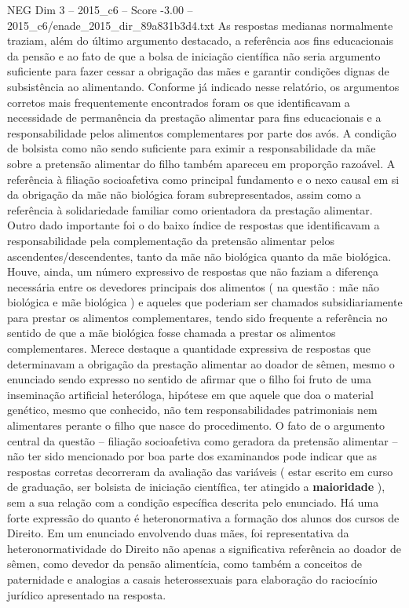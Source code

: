 \begin{textsample}{NEG Dim 3 – 2015\_c6 – Score -3.00 – 2015\_c6/enade\_2015\_dir\_89a831b3d4.txt}
As respostas medianas normalmente traziam, além do último argumento destacado, a referência aos fins educacionais da pensão e ao fato de que a bolsa de iniciação científica não seria argumento suficiente para fazer cessar a obrigação das mães e garantir condições dignas de subsistência ao alimentando.
Conforme já indicado nesse relatório, os argumentos corretos mais frequentemente encontrados foram os que identificavam a necessidade de permanência da prestação alimentar para fins educacionais e a responsabilidade pelos alimentos complementares por parte dos avós.
A condição de bolsista como não sendo suficiente para eximir a responsabilidade da mãe sobre a pretensão alimentar do filho também apareceu em proporção razoável.
A referência à filiação socioafetiva como principal fundamento e o nexo causal em si da obrigação da mãe não biológica foram subrepresentados, assim como a referência à solidariedade familiar como orientadora da prestação alimentar.
Outro dado importante foi o do baixo índice de respostas que identificavam a responsabilidade pela complementação da pretensão alimentar pelos ascendentes/descendentes, tanto da mãe não biológica quanto da mãe biológica.
Houve, ainda, um número expressivo de respostas que não faziam a diferença necessária entre os devedores principais dos alimentos ( na questão : mãe não biológica e mãe biológica ) e aqueles que poderiam ser chamados subsidiariamente para prestar os alimentos complementares, tendo sido frequente a referência no sentido de que a mãe biológica fosse chamada a prestar os alimentos complementares.
Merece destaque a quantidade expressiva de respostas que determinavam a obrigação da prestação alimentar ao doador de sêmen, mesmo o enunciado sendo expresso no sentido de afirmar que o filho foi fruto de uma inseminação artificial heteróloga, hipótese em que aquele que doa o material genético, mesmo que conhecido, não tem responsabilidades patrimoniais nem alimentares perante o filho que nasce do procedimento.
O fato de o argumento central da questão – filiação socioafetiva como geradora da pretensão alimentar – não ter sido mencionado por boa parte dos examinandos pode indicar que as respostas corretas decorreram da avaliação das variáveis ( estar escrito em curso de graduação, ser bolsista de iniciação científica, ter atingido a \textbf{maioridade} ), sem a sua relação com a condição específica descrita pelo enunciado.
Há uma forte expressão do quanto é heteronormativa a formação dos alunos dos cursos de Direito.
Em um enunciado envolvendo duas mães, foi representativa da heteronormatividade do Direito não apenas a significativa referência ao doador de sêmen, como devedor da pensão alimentícia, como também a conceitos de paternidade e analogias a casais heterossexuais para elaboração do raciocínio jurídico apresentado na resposta.

\end{textsample}
